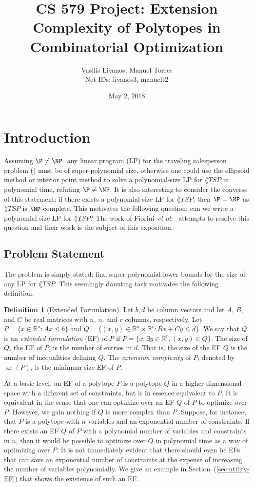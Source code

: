 \documentclass{article}
\title{CS 579 Project: Extension Complexity of Polytopes in Combinatorial Optimization}
\author{Vasilis Livanos, Manuel Torres \\ Net IDs: livanos3, manuelt2}
\date{May 2, 2018}
\makeatletter
\theoremstyle{definition}
\newtheorem{definition}[theorem]{Definition}
\theoremstyle{remark}
\newcommand{\cetal}{\textit{et al.\@}}  %
\newcommand{\xc}{\operatorname{xc}}
\renewcommand{\R}{\mathbb{R}}
\makeatother
\begin{document}
\maketitle

\section{Introduction}

Assuming $\P \ne \NP$, any linear program (LP) for the traveling salesperson problem () must be of super-polynomial size, otherwise one could use the ellipsoid method or interior point method to solve a polynomial-size LP for $\lang{TSP}$ in polynomial time, refuting $\P \ne \NP$. It is also interesting to consider the converse of this statement: if there exists a polynomial-size LP for $\lang{TSP}$, then $\P = \NP$ as $\lang{TSP}$ is $\NP$-complete. This motivates the following question: can we write a polynomial size LP for $\lang{TSP}$? The work of Fiorini~\cetal~\cite{fiorini} attempts to resolve this question and their work is the subject of this exposition.

\subsection{Problem Statement}

The problem is simply stated: find super-polynomial lower bounds for the size of any LP for $\lang{TSP}$. This seemingly daunting task motivates the following definition. 

\begin{definition}[Extended Formulation]
Let $b,d$ be column vectors and let $A$, $B$, and $C$ be real matrices with $n$, $n$, and $r$ columns, respectively. Let $P = \{x \in \R^n : Ax \le b\}$ and $Q = \{(x,y) \in \R^n \times \R^r : Bx + Cy \le d\}$. We say that $Q$ is an \emph{extended formulation} (EF) of $P$ if $P = \{x : \exists y \in \R^r, (x,y) \in Q\}$. The size of $Q$, the EF of $P$, is the number of entries in $d$. That is, the size of the EF $Q$ is the number of inequalities defining $Q$. The \emph{extension complexity} of $P$, denoted by $\xc(P)$, is the minimum size EF of $P$.
\end{definition}

At a basic level, an EF of a polytope $P$ is a polytope $Q$ in a higher-dimensional space with a different set of constraints, but is in essence equivalent to $P$. It is equivalent in the sense that one can optimize over an EF $Q$ of $P$ to optimize over $P$. However, we gain nothing if $Q$ is more complex than $P$. Suppose, for instance, that $P$ is a polytope with $n$ variables and an exponential number of constraints. If there exists an EF $Q$ of $P$ with a polynomial number of variables and constraints in $n$, then it would be possible to optimize over $Q$ in polynomial time as a way of optimizing over $P$. It is not immediately evident that there should even be EFs that can save an exponential number of constraints at the expense of increasing the number of variables polynomially. We give an example in Section~(\ref{sec:utility-EF}) that shows the existence of such an EF.
\end{document}
